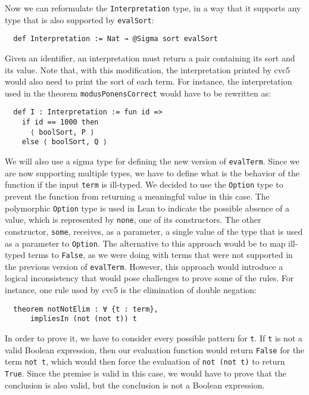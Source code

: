 Now we can reformulate the \texttt{Interpretation} type, in a way that
it supports any type that is also supported by \texttt{evalSort}:

\begin{verbatim}
  def Interpretation := Nat → @Sigma sort evalSort
\end{verbatim}

Given an identifier, an interpretation must return a pair containing its sort
and its value. Note that, with this modification, the interpretation printed
by cvc5 would also need to print the sort of each term. For instance,
the interpretation used in the theorem \texttt{modusPonensCorrect} would have
to be rewritten as:

\begin{verbatim}
  def I : Interpretation := fun id =>
    if id == 1000 then
      ⟨ boolSort, P ⟩
    else ⟨ boolSort, Q ⟩
\end{verbatim}

We will also use a sigma type for defining the new version of \texttt{evalTerm}.
%
Since we are now supporting multiple types, we have to define what is the behavior
of the function if the input \texttt{term} is ill-typed.
We decided to use the \texttt{Option} type to prevent the function from returning
a meaningful value in this case. The polymorphic \texttt{Option} type is
used in Lean to
indicate the possible absence of a value, which is represented by \texttt{none}, one of its
constructors. The other constructor, \texttt{some}, receives, as a parameter, a single value
of the type that is used as a parameter to \texttt{Option}.
The alternative to this approach would be to map ill-typed
terms to \texttt{False}, as we were doing with terms that were not supported
in the previous version of \texttt{evalTerm}.
However, this approach would introduce
a logical inconsistency that would pose challenges to prove some of the rules.
For instance, one rule used by cvc5 is the elimination of double negation:

\begin{verbatim}
  theorem notNotElim : ∀ {t : term},
      impliesIn (not (not t)) t
\end{verbatim}

In order to prove it, we have to consider every possible pattern for \texttt{t}.
If \texttt{t} is not a valid Boolean expression, then our evaluation function would
return \texttt{False} for the term \texttt{not t}, which would then force the
evaluation of \texttt{not (not t)} to return \texttt{True}. Since the premise
is valid in this case, we would have to prove that the conclusion is also valid,
but the conclusion is not a Boolean expression.


